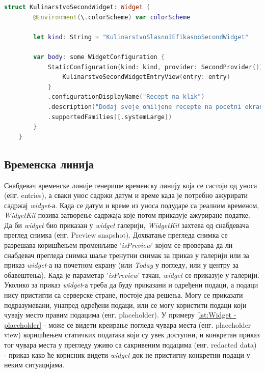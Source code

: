 \documentclass[12pt,oneside]{memoir}
\begin{document}
\begin{lstlisting}[caption=\textit{{Widget - почетна конфигурација}}, label={lst:Widget - почетна конфигурација}, language=Swift, frame=single]
    struct KulinarstvoSecondWidget: Widget {
        @Environment(\.colorScheme) var colorScheme
        
        let kind: String = "KulinarstvoSlasnoIEfikasnoSecondWidget"
        
        var body: some WidgetConfiguration {
            StaticConfiguration(kind: kind, provider: SecondProvider()) { entry in
                KulinarstvoSecondWidgetEntryView(entry: entry)
            }
            .configurationDisplayName("Recept na klik")
            .description("Dodaj svoje omiljene recepte na pocetni ekran")
            .supportedFamilies([.systemLarge])
        }
    }
\end{lstlisting}

\subsection{Временска линија}
\label{subsec:Временска линија}
\indent Снабдевач временске линије генерише временску линију која се састоји од уноса (енг. entries), а сваки унос садржи датум и време када је потребно ажурирати садржај \textit{widget}-а. Када се датум и време из уноса подударе са реалним временом, \textit{WidgetKit} позива затворење садржаја које потом приказује ажуриране податке. 
\\
\indent Да би \textit{widget} био приказан у \textit{widget} галерији, \textit{WidgetKit} захтева од снабдевача преглед снимка (енг. Preview snapshot). Дохватање прегледа снимка се разрешава коришћењем променљиве '\textit{isPreview}' којом се проверава да ли снабдевач прегледа снимка шаље тренутни снимак за приказ у галерији или за приказ \textit{widget}-а на почетном екрану (или \textit{Today} у погледу, или у центру за обавештења). Када је параметар '\textit{isPreview}' тачан, \textit{widget} се приказује у галерији. Уколико за приказ \textit{widget}-а треба да буду приказани и одређени подаци, а подаци нису пристигли са серверске стране, постоје два решења. Могу се приказати подразумевани, унапред одређени подаци, или се могу користити подаци који чувају место правим подацима (енг. placeholder). У примеру \ref{lst:Widget - placeholder} -  може се видети креирање погледа чувара места (енг. placeholder view) коришћењем статичких података који су увек доступни, и конкретан приказ тог чувара места у прегледу уживо са сакривеним подацима (енг. redacted data) - приказ како ће корисник видети \textit{widget} док не пристигну конкретни подаци у неким ситуацијама.
\end{document}
